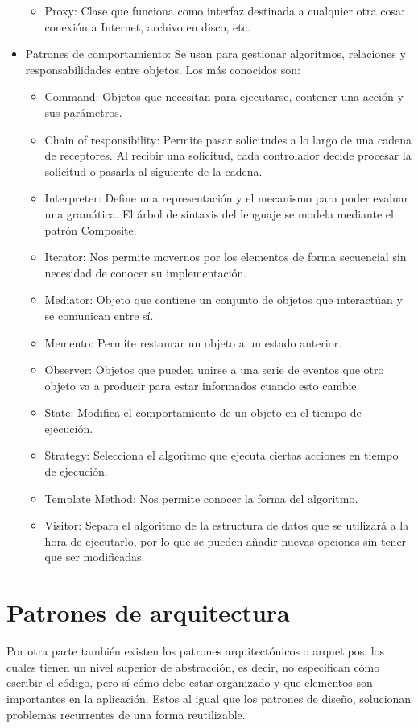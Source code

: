 \documentclass[12pt]{report} %
\begin{document}
\begin{itemize}
\begin{itemize}
 		\item Proxy: Clase que funciona como interfaz destinada a cualquier otra cosa: conexión a Internet, archivo en disco, etc.
 	\end{itemize}
 	\item Patrones de comportamiento: Se usan para gestionar algoritmos, relaciones y responsabilidades entre objetos. Los más conocidos son: 
 	\begin{itemize}
 		\item Command: Objetos que necesitan para ejecutarse, contener una acción y sus parámetros. 
 		\item Chain of responsibility: Permite pasar solicitudes a lo largo de una cadena de receptores. Al recibir una solicitud, cada controlador decide procesar la solicitud o pasarla al siguiente de la cadena.
 		\item Interpreter: Define una representación y el mecanismo para poder evaluar una gramática. El árbol de sintaxis del lenguaje se modela mediante el patrón Composite.
 		\item Iterator: Nos permite movernos por los elementos de forma secuencial sin necesidad de conocer su implementación.
 		\item Mediator: Objeto que contiene un conjunto de objetos que interactúan y se comunican entre sí.
 		\item Memento: Permite restaurar un objeto a un estado anterior.
 		\item Observer: Objetos que pueden unirse a una serie de eventos que otro objeto va a producir para estar informados cuando esto cambie.
 		\item State: Modifica el comportamiento de un objeto en el tiempo de ejecución.
 		\item Strategy: Selecciona el algoritmo que ejecuta ciertas acciones en tiempo de ejecución.
 		\item Template Method: Nos permite conocer la forma del algoritmo.
 		\item Visitor: Separa el algoritmo de la estructura de datos que se utilizará a la hora de ejecutarlo, por lo que se pueden añadir nuevas opciones sin tener que ser modificadas.
 	\end{itemize}
	 \end{itemize}
 \section{Patrones de arquitectura}
 Por otra parte también existen los patrones arquitectónicos o arquetipos, los cuales tienen un nivel superior de abstracción, es decir, no especifican cómo escribir el código, pero sí cómo debe estar organizado y que elementos son importantes en la aplicación. Estos al igual que los patrones de diseño, solucionan problemas recurrentes de una forma reutilizable.
 
\end{document}
